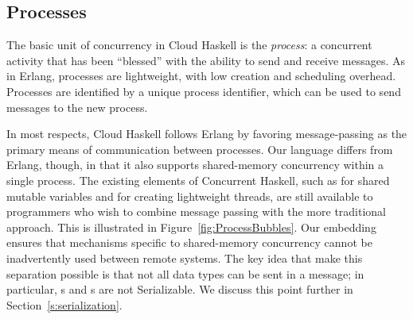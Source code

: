 \documentclass[preprint]{sigplanconf}
\begin{document}
\subsection{Processes}
\label{s:processes}

The basic unit of concurrency in Cloud Haskell is the {\em process}:  a concurrent activity that has been ``blessed'' with the ability to send and receive messages. As in Erlang, processes are lightweight, with low creation and scheduling overhead.  Processes are identified by a unique process identifier, which can be used to send messages to the new process.

In most respects, Cloud Haskell follows Erlang by favoring message-passing as the primary means of communication between processes. Our language differs from Erlang, though, in that it also supports shared-memory concurrency within a single process. The existing elements of Concurrent Haskell, such as  for shared mutable variables and  for creating lightweight threads, are still available to programmers who wish to combine message passing with the more traditional approach. This is illustrated in Figure~\ref{fig:ProcessBubbles}. Our embedding ensures that mechanisms specific to shared-memory concurrency cannot be inadvertently used between remote systems.  The key idea that make this separation possible is that not all data types can be sent in a message; in particular, s and s are not Serializable.
We discuss this point further in Section~\ref{s:serialization}.
\end{document}
